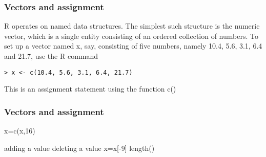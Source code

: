 \begin{frame}
\frametitle{Vectors and assignment}

R operates on named data structures. The simplest such structure is the numeric vector, which is a single entity consisting of an ordered collection of numbers. To set up a vector
named x, say, consisting of five numbers, namely 10.4, 5.6, 3.1, 6.4 and 21.7, use the R command

\begin{framed}
\begin{verbatim}
> x <- c(10.4, 5.6, 3.1, 6.4, 21.7)
\end{verbatim}
\end{framed}

This is an assignment statement using the function c()

\end{frame} 
 
\begin{frame}
\frametitle{Vectors and assignment} 
x=c(x,16)

adding a value
deleting a value
x=x[-9]
length()
\end{frame} 


